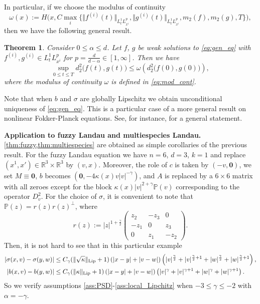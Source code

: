 \documentclass[10pt,oneside]{amsart}
\numberwithin{equation}{section}
\numberwithin{definition}{section}
\newtheorem{theorem}{Theorem}
\numberwithin{theorem}{section}
\numberwithin{lemma}{section}
\begin{document}
%
In particular, if we choose the modulus of continuity
%
\begin{equation}\label{eq:mod_cont}
  \omega(x):=H\Big(x,
  C\max_{i}\big\{\Vert f^{(i)}(t)\Vert_{L^1_tL^p_{x^i}},\Vert g^{(i)}(t)\Vert_{L^1_tL^p_{x^i}},m_2(f),m_2(g),T\big\}\Big),
\end{equation}
%
then we have the following general result.
% 
\begin{theorem}\label{thm:gen_thm}
  Consider $0\leq \alpha \leq d$. Let $f$, $g$ be weak solutions to \eqref{eq:gen_eq} with $f^{(i)},g^{(i)}\in L^1_tL^p_{x^i}$ for $p=\frac{d}{d-\alpha}\in [1,\infty]$. Then we have
  \begin{equation*}
    \sup_{0\leq t\leq T} d_2^2\big(f(t),g(t)\big) \leq \omega\left(d_2^2\big(f(0),g(0)\big)\right),
  \end{equation*}
  where the modulus of continuity $\omega$ is defined in \cref{eq:mod_cont}.
\end{theorem}
% 
Note that when $b$ and $\sigma$ are globally Lipschitz we obtain unconditional uniqueness of \cref{eq:gen_eq}. This is a particular case of a more general result on nonlinear Fokker-Planck equations. See, for instance, \cite{Feng2018LandauTypeEqs} for a general statement. 

\textbf{Application to fuzzy Landau and multiespecies Landau.} \cref{thm:fuzzy,thm:multiespecies} are obtained as simple corollaries of the previous result. For the fuzzy Landau equation we have $n=6$, $d=3$, $k=1$ and replace $(x^1,x')\in \mathbb R^3\times \mathbb R^3$ by $(v,x)$. Moreover, the role of $c$ is taken by $(-v,\mathbf{0})$, we set $M\equiv \mathbf 0$, $b$ becomes $(\mathbf{0},-4\kappa (x)v|v|^{-\gamma})$, and $A$ is replaced by a $6\times 6$ matrix with all zeroes except for the block $\kappa(x)|v|^{2+\gamma}\mathbb{P}(v)$ corresponding to the operator $D^2_v$. For the choice of $\sigma$, it is convenient to note that $\mathbb P(z) = r(z)r(z)^\perp$, where
%
\begin{equation*}
  r(z):=|z|^{1+\frac{\gamma}{2}}
  \begin{pmatrix}z_{2} & -z_{3} & 0\\
    -z_{1} & 0 & z_{3}\\
    0 & z_{1} & -z_{2}
  \end{pmatrix}.
\end{equation*}
%
Then, it is not hard to see that in this particular example
%
\begin{align*}
  \left|\sigma(x,v)-\sigma(y,w)\right|&
  \leq C_{\gamma}(\Vert\sqrt{\kappa}\Vert_{\textnormal{Lip}}+1)\left(|x-y|+|v-w|\right)\left(|v|^{\frac{\gamma}{2}}+|v|^{\frac{\gamma}{2}+1}+|w|^{\frac{\gamma}{2}}+|w|^{\frac{\gamma}{2}+1}\right),\\
  \left|b(x,v)- b(y,w)\right|&
  \leq C_{\gamma}(\Vert\kappa\Vert_{\textnormal{Lip}}+1)\left(|x-y|+|v-w|\right)\left(|v|^{\gamma}+|v|^{\gamma+1}+|w|^{\gamma}+|w|^{\gamma+1}\right).
\end{align*}
%
So we verify assumptions \ref{ass:PSD}-\ref{ass:local_Lipchitz} when $-3\leq \gamma \leq -2$ with $\alpha = -\gamma$.
\end{document}
